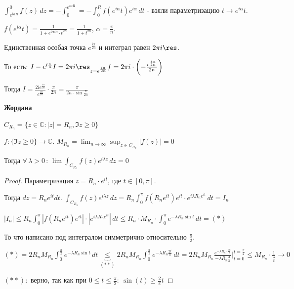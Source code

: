 \begin{example}
\begin{enumerate}
{            $\int_{e^{i\alpha R}}^{0} f(z) \, dz = -\int_{0}^{e^{i \alpha R}} = -\int_{0}^{R} f(e^{i \alpha} t) e^{i \alpha} \, dt$ - 
            взяли параметризацию $t \to e^{i \alpha} t$.

            $f(e^{i \alpha}t) = \frac{1}{1 + e^{2 \pi i \alpha} \cdot t^{2n}} = \frac{1}{1 + t^{2n}}$, $\alpha = \frac{\pi}{n}$.

            Единственная особая точка $e^{\frac{i \pi}{2n}}$ и интеграл равен
            $2 \pi i \res$.

            То есть: $I - e^{i \frac{\pi }{n}} I = 2 \pi i \res_{z = e^{\frac{i \pi}{2n}}} f = 2 \pi i \cdot \left ( - \frac{e^{\frac{i \pi}{2n}}}{2n}  \right )$
            
            Тогда $I = \frac{2 i e^{\frac{i \pi}{2n}}}{e^{\frac{i \pi}{2n}}} \cdot \frac{\pi}{2n} = \frac{\pi}{2n \cdot \sin \frac{\pi}{2n}}$
        }
    \end{enumerate}
\end{example}

\begin{lemma}
    \textbf{Жордана}

    $C_{R_n} = \{ z \in \mathbb{C} : |z| = R_n, \Im z \geqslant 0 \}$

    $f : \{ \Im z \geqslant 0 \} \to \mathbb{C}$. $M_{R_n} = \lim_{n \to \infty} \sup_{z \in C_{R_n}} |f(z)| = 0$

    Тогда $\forall \, \lambda > 0 \, : \, \lim \int_{C_{R_n}} f(z) e^{i \lambda z} \, dz = 0$
\end{lemma}

\begin{proof}
    Параметризация $z = R_n \cdot e^{it}$, где $t \in [0, \pi]$. 
    
    Тогда $dz = R_n e^{it} dt$.
    $\int_{C_{R_n}} f(z) e^{i \lambda z} \, dz = R_n \int_{0}^{\pi} f(R_n e^{it}) e^{it} \cdot e^{i \lambda R_n e^{it}} \, dt = I_n$

    $|I_n| \leqslant  R_n \int_{0}^{\pi} |f(R_n e^{it}) e^{it}| \cdot |e^{i \lambda R_n e^{it}}| \, dt \leqslant R_n \cdot M_{R_n} \cdot \int_{0}^{\pi} e^{- \lambda R_n \sin t} \, dt = (*) $

    То что написано под интегралом симметрично относительно $\frac{\pi}{2}$.

    $(*) = 2R_n M_{R_n} \int_{0}^{\frac{\pi}{2}} e^{-\lambda R_n \sin t} \, dt \underbrace{\leqslant}_{(**)} 
    2R_n M_{R_n} \int_{0}^{\frac{\pi}{2}} e^{-\lambda R_n \frac{2t}{\pi}} \, dt = 2R_n M_{R_n} \frac{e^{-\lambda R_n \cdot \frac{2t}{\pi}}}{-\lambda R_n \frac{2}{\pi}} \bigg |_{t = 0}^{t = \frac{\pi}{2}} 
    \leqslant M_{R_n} \cdot \frac{1}{\frac{\lambda}{\pi}} \rightarrow 0$
    
    $(**): $ верно, так как при $0 \leq t \leq \frac{\pi}{2}: \ \sin(t) \geq \frac{2}{\pi} t$
\end{proof}

